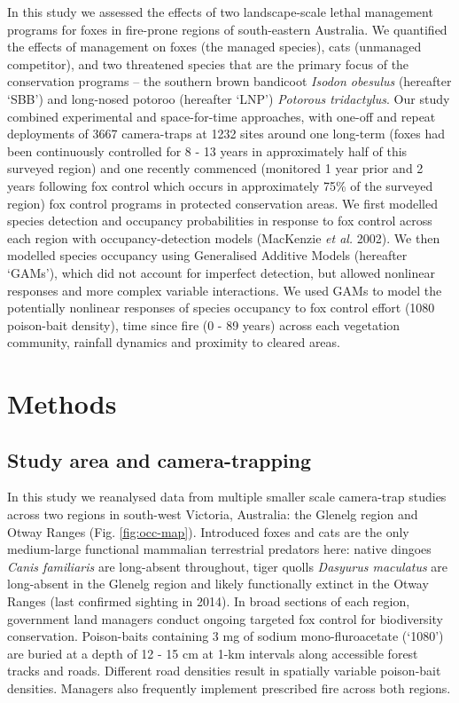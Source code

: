 \documentclass[11pt,a4paper,titlepage,twoside,openright]{style/unimelbthesis}
\begin{document}
\begin{mainmatter}
In this study we assessed the effects of two landscape-scale lethal management programs for foxes in fire-prone regions of south-eastern Australia. We quantified the effects of management on foxes (the managed species), cats (unmanaged competitor), and two threatened species that are the primary focus of the conservation programs -- the southern brown bandicoot \emph{Isodon obesulus} (hereafter `SBB') and long-nosed potoroo (hereafter `LNP') \emph{Potorous tridactylus}. Our study combined experimental and space-for-time approaches, with one-off and repeat deployments of 3667 camera-traps at 1232 sites around one long-term (foxes had been continuously controlled for 8 - 13 years in approximately half of this surveyed region) and one recently commenced (monitored 1 year prior and 2 years following fox control which occurs in approximately 75\% of the surveyed region) fox control programs in protected conservation areas. We first modelled species detection and occupancy probabilities in response to fox control across each region with occupancy-detection models (MacKenzie \emph{et al.} 2002). We then modelled species occupancy using Generalised Additive Models (hereafter `GAMs'), which did not account for imperfect detection, but allowed nonlinear responses and more complex variable interactions. We used GAMs to model the potentially nonlinear responses of species occupancy to fox control effort (1080 poison-bait density), time since fire (0 - 89 years) across each vegetation community, rainfall dynamics and proximity to cleared areas.

\newpage

\hypertarget{methods-1}{%
\section{Methods}\label{methods-1}}

\hypertarget{study-area-and-camera-trapping}{%
\subsection{Study area and camera-trapping}\label{study-area-and-camera-trapping}}

In this study we reanalysed data from multiple smaller scale camera-trap studies across two regions in south-west Victoria, Australia: the Glenelg region and Otway Ranges (Fig. \ref{fig:occ-map}). Introduced foxes and cats are the only medium-large functional mammalian terrestrial predators here: native dingoes \emph{Canis familiaris} are long-absent throughout, tiger quolls \emph{Dasyurus maculatus} are long-absent in the Glenelg region and likely functionally extinct in the Otway Ranges (last confirmed sighting in 2014). In broad sections of each region, government land managers conduct ongoing targeted fox control for biodiversity conservation. Poison-baits containing 3 mg of sodium mono-fluroacetate (`1080') are buried at a depth of 12 - 15 cm at 1-km intervals along accessible forest tracks and roads. Different road densities result in spatially variable poison-bait densities. Managers also frequently implement prescribed fire across both regions.


\end{mainmatter}
\end{document}
